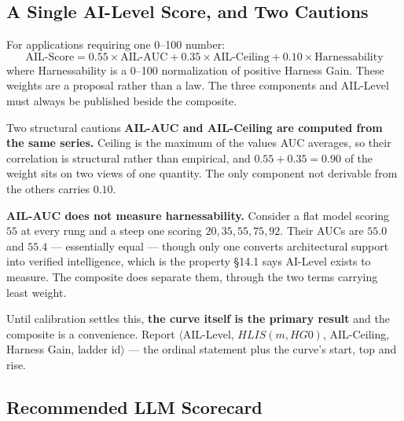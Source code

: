 \documentclass[11pt]{article}
\theoremstyle{definition}
\begin{document}
\subsection{A Single AI-Level Score, and Two Cautions}\label{sec:composite}

For applications requiring one 0--100 number:
\begin{equation}
\text{AIL-Score} = 0.55 \times \text{AIL-AUC} + 0.35 \times \text{AIL-Ceiling} + 0.10 \times \text{Harnessability}
\end{equation}
where Harnessability is a 0--100 normalization of positive Harness Gain. These weights are a proposal rather than a law. The three components and AIL-Level must always be published beside the composite.

\begin{cautionbox}{Two structural cautions}
\textbf{AIL-AUC and AIL-Ceiling are computed from the same series.} Ceiling is the maximum of the values AUC averages, so their correlation is structural rather than empirical, and $0.55 + 0.35 = 0.90$ of the weight sits on two views of one quantity. The only component not derivable from the others carries $0.10$.

\textbf{AIL-AUC does not measure harnessability.} Consider a flat model scoring $55$ at every rung and a steep one scoring $20, 35, 55, 75, 92$. Their AUCs are $55.0$ and $55.4$ --- essentially equal --- though only one converts architectural support into verified intelligence, which is the property \S14.1 says AI-Level exists to measure. The composite does separate them, through the two terms carrying least weight.

Until calibration settles this, \textbf{the curve itself is the primary result} and the composite is a convenience. Report $\langle$AIL-Level, $HLIS(m,HG0)$, AIL-Ceiling, Harness Gain, ladder id$\rangle$ --- the ordinal statement plus the curve's start, top and rise.
\end{cautionbox}

\subsection{Recommended LLM Scorecard}
\end{document}
